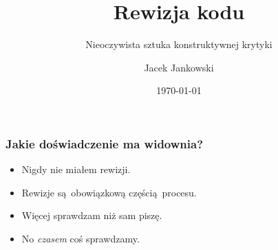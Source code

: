 \documentclass[xcolor=dvipsnames]{beamer}%
\title{Rewizja kodu}
\subtitle{Nieoczywista sztuka konstruktywnej krytyki}
\author{Jacek Jankowski}
\date{\today}  %
\begin{document}
\begin{frame}
	\titlepage
\end{frame}


\begin{frame}
	\frametitle{Jakie doświadczenie ma widownia?}
	\begin{center}
		\begin{itemize}
			\item Nigdy nie miałem rewizji.
			\item Rewizje są obowiązkową częścią procesu.
			\item Więcej sprawdzam niż sam piszę.
			\item No \textit{czasem} coś sprawdzamy.
		\end{itemize}
	\end{center}
\end{frame}
\end{document}
